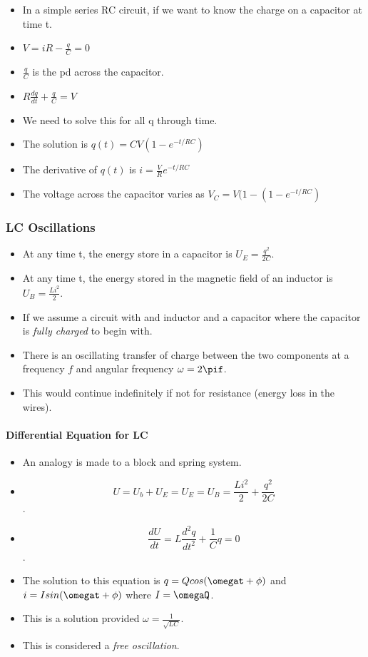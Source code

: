 \documentclass[11pt]{article}
\begin{document}
\begin{itemize}
\tightlist
\item
  In a simple series RC circuit, if we want to know the charge on a
  capacitor at time t.
\item
  \(V = iR - \frac{q}{C} = 0\)
\item
  \(\frac{q}{C}\) is the pd across the capacitor.
\item
  \(R\frac{dq}{dt} + \frac{q}{C} = V\)
\item
  We need to solve this for all q through time.
\item
  The solution is \(q(t) = CV(1 - e^{-t/RC})\)
\item
  The derivative of \(q(t)\) is \(i = \frac{V}{R}e^{-t/RC}\)
\item
  The voltage across the capacitor varies as
  \(V_C = V(1 - (1 - e^{-t/RC})\)
\end{itemize}

\hypertarget{lc-oscillations}{%
\subsubsection{LC Oscillations}\label{lc-oscillations}}

\begin{itemize}
\tightlist
\item
  At any time t, the energy store in a capacitor is
  \(U_E = \frac{q^2}{2C}\).
\item
  At any time t, the energy stored in the magnetic field of an inductor
  is \(U_B = \frac{Li^2}{2}\).
\item
  If we assume a circuit with and inductor and a capacitor where the
  capacitor is \emph{fully charged} to begin with.
\item
  There is an oscillating transfer of charge between the two components
  at a frequency \(f\) and angular frequency \(\omega = 2\pif\).
\item
  This would continue indefinitely if not for resistance (energy loss in
  the wires).
\end{itemize}

\hypertarget{differential-equation-for-lc}{%
\paragraph{Differential Equation for
LC}\label{differential-equation-for-lc}}

\begin{itemize}
\tightlist
\item
  An analogy is made to a block and spring system.
\item
  \[U = U_b + U_E = U_E = U_B = \frac{Li^2}{2} + \frac{q^2}{2C}\].
\item
  \[\frac{dU}{dt} = L\frac{d^2q}{dt^2} + \frac{1}{C}q = 0\].
\item
  The solution to this equation is \(q = Qcos(\omegat + \phi)\) and
  \(i = Isin(\omegat + \phi)\) where \(I = \omegaQ\).
\item
  This is a solution provided \(\omega = \frac{1}{\sqrt{LC}}\).
\item
  This is considered a \emph{free oscillation}.
\end{itemize}
\end{document}
